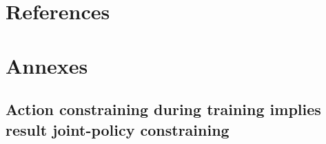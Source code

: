 \documentclass[runningheads]{llncs}
\newcounter{proof}
\begin{document}
%
%
%
% 
% 
%
\section*{References}

% 




\newpage

\section*{Annexes}

\subsection*{Action constraining during training implies result joint-policy constraining}

\end{document}
